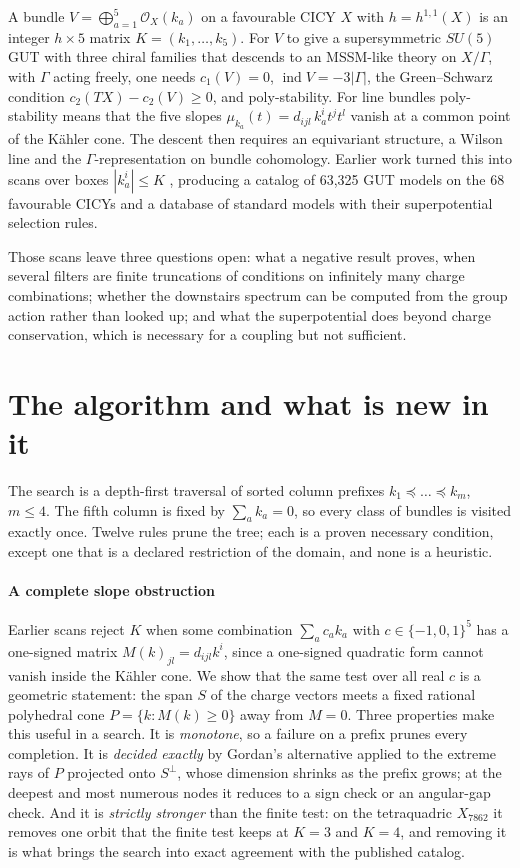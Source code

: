 \documentclass[10pt,a4paper]{article}
\newcommand{\Oc}{\mathcal{O}}
\newcommand{\ind}{\operatorname{ind}}
\newcommand{\Xa}{X_{7862}}
\begin{document}
A bundle $V=\bigoplus_{a=1}^5\Oc_X(k_a)$ on a favourable CICY $X$ with
$h=h^{1,1}(X)$ is an integer $h\times5$ matrix $K=(k_1,\dots,k_5)$. For $V$ to
give a supersymmetric $SU(5)$ GUT with three chiral families that descends to
an MSSM-like theory on $X/\Gamma$, with $\Gamma$ acting freely, one needs
$c_1(V)=0$, $\ind V=-3|\Gamma|$, the Green--Schwarz condition
$c_2(TX)-c_2(V)\ge0$, and poly-stability. For line bundles poly-stability means
that the five slopes $\mu_{k_a}(t)=d_{ijl}\,k_a^i t^j t^l$ vanish at a common
point of the Kähler cone. The descent then requires an equivariant structure, a
Wilson line and the $\Gamma$-representation on bundle cohomology. Earlier work
turned this into scans over boxes $|k_a^i|\le K$
\cite{AGLP11,AGLP12,ACGLP13}, producing a catalog of 63,325 GUT models on the
68 favourable CICYs and a database of standard models with their
superpotential selection rules.

Those scans leave three questions open: what a negative result proves, when
several filters are finite truncations of conditions on infinitely many charge
combinations; whether the downstairs spectrum can be computed from the group
action rather than looked up; and what the superpotential does beyond charge
conservation, which is necessary for a coupling but not sufficient.

\section{The algorithm and what is new in it}

The search is a depth-first traversal of sorted column prefixes
$k_1\preceq\dots\preceq k_m$, $m\le4$. The fifth column is fixed by
$\sum_ak_a=0$, so every class of bundles is visited exactly once. Twelve rules
prune the tree; each is a proven necessary condition, except one that is a
declared restriction of the domain, and none is a heuristic.

\paragraph{A complete slope obstruction} Earlier scans reject $K$ when some
combination $\sum_ac_ak_a$ with $c\in\{-1,0,1\}^5$ has a one-signed matrix
$M(k)_{jl}=d_{ijl}k^i$, since a one-signed quadratic form cannot vanish inside
the Kähler cone. We show that the same test over all real $c$ is a geometric
statement: the span $S$ of the charge vectors meets a fixed rational polyhedral
cone $P=\{k:M(k)\ge0\}$ away from $M=0$. Three properties make this useful in a
search. It is \emph{monotone}, so a failure on a prefix prunes every
completion. It is \emph{decided exactly} by Gordan's alternative applied to the
extreme rays of $P$ projected onto $S^\perp$, whose dimension shrinks as the
prefix grows; at the deepest and most numerous nodes it reduces to a sign check
or an angular-gap check. And it is \emph{strictly stronger} than the finite
test: on the tetraquadric $\Xa$ it removes one orbit that the finite test keeps
at $K=3$ and $K=4$, and removing it is what brings the search into exact
agreement with the published catalog.
\end{document}
